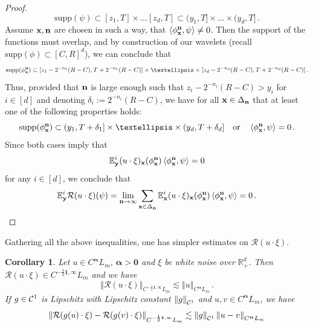 \documentclass[12pt]{article}
\numberwithin{equation}{section}
\theoremstyle{plain}
\newtheorem{corollary}[theorem]{Corollary}
\theoremstyle{definition}
\newcommand{\scalar}[1]{\left\langle #1 \right\rangle}
\newcommand{\norm}[1]{\left\Vert #1\right\Vert}
\def\cR{\mathcal{R}}\def\cE{\mathcal{E}}
\def\bR{\mathbb{R}}\def\bS{\mathbb{S}}
\def\bE{\mathbb{E}}\def\bW{\mathbb{W}}
\def\fy{\mathbf y}\def\fz{\mathbf z}
\def\falpha{{\boldsymbol\alpha}}
\def\foo{{\boldsymbol 0}}
\def\fone{{\boldsymbol 1}}
\def\supp{\mbox{supp}}
\begin{document}
\begin{proof}
    \[
        \supp(\psi) \subset [z_1,T]\times\dots [z_d,T] \subset (y_1,T]\times\dots\times(y_d,T]\,.
    \]
    Assume $\mathbf x,\mathbf n$ are chosen in such a way, that $\scalar{\phi_\fx^\fn,\psi} \neq 0$. Then the support of the functions must overlap, and by construction of our wavelets (recall $\supp(\phi)\subset[C,R]^d$), we can conclude that
    \[
        \supp(\phi_\fx^\fn)\subset[z_1-2^{-n_1}(R-C),T+2^{-n_1}(R-C)] \times\dots\times [z_d-2^{-n_d}(R-C),T+2^{-n_d}(R-C)]\,.
    \]
    Thus, provided that $\mathbf n$ is large enough such that $z_i-2^{-n_i}(R-C) > y_i$ for $i\in[d]$ and denoting $\delta_i := 2^{-n_i}(R-C)$, we have for all $\mathbf x\in\Delta_\mathbf n$ that at least one of the following properties holds:
    \[
        \supp(\phi_\fx^\fn)\subset(y_1,T+\delta_1]\times\dots\times(y_d,T+\delta_d]\quad \text{or} \quad \scalar{\phi^\fn_\fx,\psi} = 0\,.
    \]
    Since both cases imply that
    \[
        \bE^i_\fy (u\cdot\xi)_\fx(\phi_\fx^\fn)\scalar{\phi_\fx^\fn,\psi} = 0
    \]
    for any $i\in[d]$, we conclude that
    \[\bE^i_\fy \cR(u\cdot\xi)(\psi) = \lim_{\fn\to\infty} \sum_{\fx\in\Delta_\fn} \bE^i_\fx (u\cdot\xi)_\fx(\phi_\fx^\fn)\scalar{\phi_\fx^\fn,\psi} = 0\,.\]
\end{proof}

Gathering all the above inequalities, one has simpler estimates on $\cR(u\cdot \xi)$.
\begin{corollary}\label{cor:ItoReconstructionInC}
    Let $u\in C^{\falpha} L_m$, $\falpha >\foo$ and $\xi$ be white noise over $\bR_+^d$. Then $\cR(u\cdot \xi)\in C^{-\frac 12\fone,\infty} L_m$ and we have
    \begin{equation}\label{ineq:ItoReconstructionInC}
        \norm{\cR(u\cdot\xi)}_{C^{-\frac 12\fone,\infty}L_m}\lesssim \norm{u}_{C^\falpha L_m}\,.
    \end{equation}
    If $g\in \mathcal{C}^1$ is Lipschitz with Lipschitz constant $\norm{g}_{\cC^1}$ and $u,v\in C^\falpha L_m$, we have
    \begin{equation}\label{ineq:ItoLikeIsometry}
        \norm{\cR(g(u)\cdot\xi)- \cR(g(v)\cdot\xi)}_{C^{-\frac 12\fone,\infty}L_m} \lesssim \norm{g}_{\cC^1} \norm{u-v}_{C^\falpha L_m}
    \end{equation}
\end{corollary}
\end{document}
